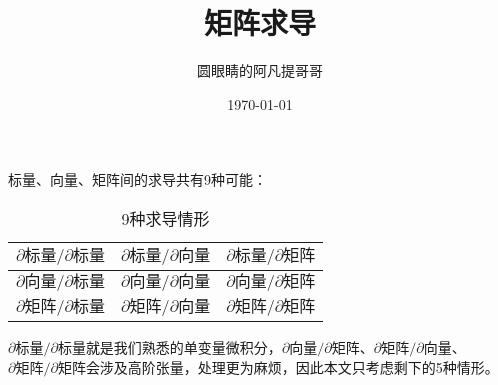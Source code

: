 \documentclass{ctexart}
\newcommand{\red}[1]{\textcolor{Solarized-red}{#1}}
\newcommand{\blue}[1]{\textcolor{Solarized-blue}{#1}}
\newcommand{\green}[1]{\textcolor{Solarized-green}{#1}}
\theoremstyle{definition}
\begin{document}
\title{矩阵求导}
\author{圆眼睛的阿凡提哥哥}
\date{\today}
\maketitle

标量、向量、矩阵间的求导共有9种可能：

\begin{table}[ht]
    \centering
    \begin{tabular}{ | c | c | c | }
        \hline
        \green{$\partial 标量 / \partial 标量$} & \blue{$\partial 标量 / \partial 向量$} & \blue{$\partial 标量 / \partial 矩阵$} \\
        \hline
        \blue{$\partial 向量 / \partial 标量$}  & \blue{$\partial 向量 / \partial 向量$} & \red{$\partial 向量 / \partial 矩阵$}  \\
        \hline
        \blue{$\partial 矩阵 / \partial 标量$}  & \red{$\partial 矩阵 / \partial 向量$}  & \red{$\partial 矩阵 / \partial 矩阵$}  \\
        \hline
    \end{tabular}
    \caption{9种求导情形}
    \label{table: 9-cases}
\end{table}

\green{$\partial 标量 / \partial 标量$}就是我们熟悉的单变量微积分，\red{$\partial 向量 / \partial 矩阵$}、\red{$\partial 矩阵 / \partial 向量$}、\red{$\partial 矩阵 / \partial 矩阵$}会涉及高阶张量，处理更为麻烦，因此本文只考虑剩下的5种情形。
\end{document}
